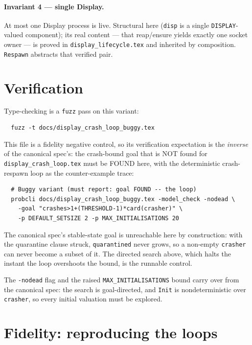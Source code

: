 \documentclass[a4paper,10pt,fleqn]{article}
\begin{document}
\paragraph{Invariant 4 --- single Display.}
At most one Display process is live.  Structural here (\texttt{disp} is a single
\texttt{DISPLAY}-valued component); its real content --- that reap/ensure yields
exactly one socket owner --- is proved in \texttt{display\_lifecycle.tex} and
inherited by composition.  \texttt{Respawn} abstracts that verified pair.

\section{Verification}
\label{sec:verify}

Type-checking is a \texttt{fuzz} pass on this variant:
\begin{verbatim}
  fuzz -t docs/display_crash_loop_buggy.tex
\end{verbatim}

This file is a fidelity negative control, so its verification expectation is
the \emph{inverse} of the canonical spec's: the crash-bound goal that is NOT
found for \texttt{display\_crash\_loop.tex} must be FOUND here, with the
deterministic crash-respawn loop as the counter-example trace:
\begin{verbatim}
  # Buggy variant (must report: goal FOUND -- the loop)
  probcli docs/display_crash_loop_buggy.tex -model_check -nodead \
    -goal "crashes>1+(THRESHOLD-1)*card(crasher)" \
    -p DEFAULT_SETSIZE 2 -p MAX_INITIALISATIONS 20
\end{verbatim}

The canonical spec's stable-state goal is unreachable here by construction:
with the quarantine clause struck, \texttt{quarantined} never grows, so a
non-empty \texttt{crasher} can never become a subset of it.  The directed
search above, which halts the instant the loop overshoots the bound, is the
runnable control.

The \texttt{-nodead} flag and the raised \texttt{MAX\_INITIALISATIONS} bound
carry over from the canonical spec: the search is goal-directed, and
\texttt{Init} is nondeterministic over \texttt{crasher}, so every initial
valuation must be explored.

\section{Fidelity: reproducing the loops}
\label{sec:fidelity}
\end{document}
